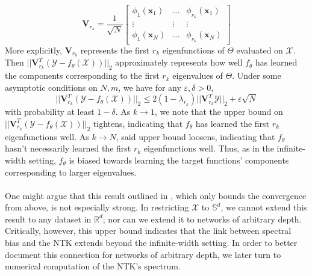 \documentclass[11pt]{article}
\newcommand{\R}{\mathbb{R}}
\newcommand{\X}{\mathcal{X}}
\newcommand{\Y}{\mathcal{Y}}
\begin{document}
$$\mathbf{V}_{r_k} = \frac{1}{\sqrt{N}}\begin{bmatrix}
    \phi_1(\mathbf{x}_1) & \dots &  \phi_{r_k}(\mathbf{x}_1)\\
    \vdots & \vdots & \vdots \\
    \phi_1(\mathbf{x}_N) & \dots &  \phi_{r_k}(\mathbf{x}_N)
\end{bmatrix}$$
More explicitly, $\mathbf{V}_{r_k}$ represents the first $r_k$ eigenfunctions of $\Theta$ evaluated on $\X$. Then $||\mathbf{V}^T_{r_k}(\Y - f_{\theta}(\X))||_2$ approximately represents
how well $f_\theta$ has learned the components corresponding to the first $r_k$ eigenvalues of $\Theta$. Under some asymptotic conditions on $N, m$, we have for any $\varepsilon, \delta > 0$,
$$||\mathbf{V}^T_{r_k}(\Y - f_{\theta}(\X))||_2 \le 2(1 - \lambda_{r_k})||\mathbf{V}^T_{r_k}\Y||_2 + \varepsilon\sqrt{N}$$
with probability at least $1 - \delta$. As $k \rightarrow 1$, we note that the upper bound on $||\mathbf{V}^T_{r_k}(\Y - f_{\theta}(\X))||_2$ tightens, indicating that $f_\theta$ has learned the first $r_k$ eigenfunctions well. As $k \rightarrow N$, said upper bound loosens, indicating that $f_\theta$ hasn't necessarily learned the first $r_k$ eigenfunctions well. Thus, as in the infinite-width setting, $f_\theta$ is biased towards learning the target functions' components corresponding to larger eigenvalues.\\
\\
One might argue that this result outlined in \cite{Cao21}, which only bounds the convergence from above, is not especially strong. In restricting $\X$ to $\mathbb{S}^d$, we cannot extend this result to any dataset in $\R^d$; nor can we extend it to networks of arbitrary depth. Critically, however, this upper bound indicates that the link between spectral bias and the NTK extends beyond the infinite-width setting. In order to better document this connection for networks of arbitrary depth, we later turn to numerical computation of the NTK's spectrum.
\end{document}
